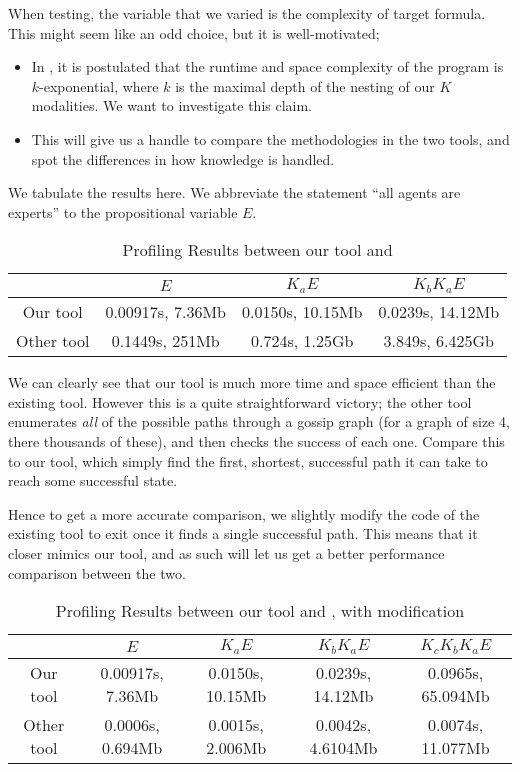 \documentclass[12pt, a4paper]{article}
\begin{document}
When testing, the variable that we varied is the complexity of target formula.
This might seem like an odd choice, but it is well-motivated;

\begin{itemize}
\item In \cite{AutomataTechniques}, it is postulated that the runtime and space
  complexity of the program is $k$-exponential, where $k$ is the maximal depth
  of the nesting of our $K$ modalities. We want to investigate this claim.
\item This will give us a handle to compare the methodologies in the two tools,
  and spot the differences in how knowledge is handled.
\end{itemize}

\bigskip

We tabulate the results here. We abbreviate the statement ``all agents are
experts'' to the propositional variable $E$. 

\begin{table}[h]
  \centering
  \begin{tabular}{|c||c|c|c|}
    \hline
    & $E$ & $ K_a E$ & $K_b K_a E$  \\ \hline 
    Our tool   & 0.00917s, 7.36Mb  & 0.0150s, 10.15Mb & 0.0239s, 14.12Mb \\ \hline 
    Other tool & 0.1449s, 251Mb & 0.724s, 1.25Gb & 3.849s, 6.425Gb \\ 
    \hline
  \end{tabular}
  \caption{Profiling Results between our tool and \cite{GithubGossip}}
  \label{tab:Proflining1}
\end{table}

We can clearly see that our tool is much more time and space efficient than the
existing tool. However this is a quite straightforward victory; the other tool
enumerates \textit{all} of the possible paths through a gossip graph (for a
graph of size 4, there thousands of these), and then checks the success of each
one. Compare this to our tool, which simply find the first, shortest, successful
path it can take to reach some successful state.

Hence to get a more accurate comparison, we slightly modify the code of the
existing tool to exit once it finds a single successful path. This means that it
closer mimics our tool, and as such will let us get a better performance
comparison between the two. 


\begin{table}[h]
  \centering
  \begin{tabular}{|c||c|c|c|c|}
    \hline
    & $E$ & $ K_a E$ & $K_b K_a E$ & $K_c K_b K_a E$ \\ \hline 
    Our tool   & 0.00917s, 7.36Mb  & 0.0150s, 10.15Mb & 0.0239s, 14.12Mb & 0.0965s, 65.094Mb \\ \hline 
    Other tool & 0.0006s, 0.694Mb  & 0.0015s, 2.006Mb & 0.0042s, 4.6104Mb & 0.0074s, 11.077Mb \\
    \hline
  \end{tabular}
  \caption{Profiling Results between our tool and \cite{GithubGossip}, with modification}
  \label{tab:Proflining2}
\end{table}
\end{document}
